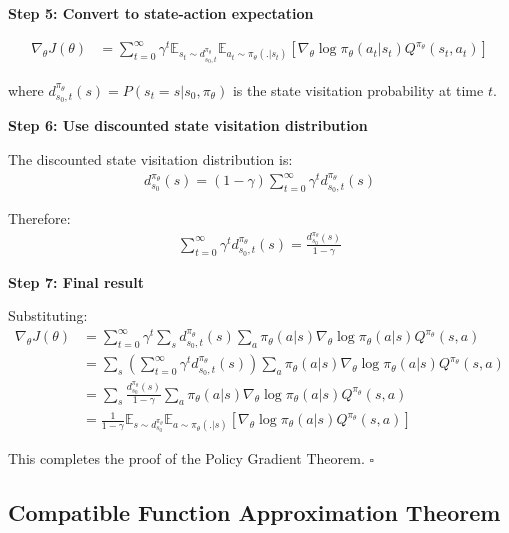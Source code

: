 \textbf{Step 5: Convert to state-action expectation}

\begin{align}
\nabla_\theta J(\theta) &= \sum_{t=0}^{\infty} \gamma^t \mathbb{E}_{s_t \sim d^{\pi_\theta}_{s_0,t}} \mathbb{E}_{a_t \sim \pi_\theta(.|s_t)} \left[ \nabla_\theta \log \pi_\theta(a_t|s_t) Q^{\pi_\theta}(s_t, a_t) \right]
\end{align}

where $d^{\pi_\theta}_{s_0,t}(s) = P(s_t = s | s_0, \pi_\theta)$ is the state visitation probability at time $t$.

\textbf{Step 6: Use discounted state visitation distribution}

The discounted state visitation distribution is:
\begin{align}
d^{\pi_\theta}_{s_0}(s) = (1-\gamma) \sum_{t=0}^{\infty} \gamma^t d^{\pi_\theta}_{s_0,t}(s)
\end{align}

Therefore:
\begin{align}
\sum_{t=0}^{\infty} \gamma^t d^{\pi_\theta}_{s_0,t}(s) = \frac{d^{\pi_\theta}_{s_0}(s)}{1-\gamma}
\end{align}

\textbf{Step 7: Final result}

Substituting:
\begin{align}
\nabla_\theta J(\theta) &= \sum_{t=0}^{\infty} \gamma^t \sum_s d^{\pi_\theta}_{s_0,t}(s) \sum_a \pi_\theta(a|s) \nabla_\theta \log \pi_\theta(a|s) Q^{\pi_\theta}(s, a) \\
&= \sum_s \left( \sum_{t=0}^{\infty} \gamma^t d^{\pi_\theta}_{s_0,t}(s) \right) \sum_a \pi_\theta(a|s) \nabla_\theta \log \pi_\theta(a|s) Q^{\pi_\theta}(s, a) \\
&= \sum_s \frac{d^{\pi_\theta}_{s_0}(s)}{1-\gamma} \sum_a \pi_\theta(a|s) \nabla_\theta \log \pi_\theta(a|s) Q^{\pi_\theta}(s, a) \\
&= \frac{1}{1-\gamma} \mathbb{E}_{s \sim d^{\pi_\theta}_{s_0}} \mathbb{E}_{a \sim \pi_\theta(.|s)} \left[ \nabla_\theta \log \pi_\theta(a|s) Q^{\pi_\theta}(s, a) \right]
\end{align}

This completes the proof of the Policy Gradient Theorem. $\square$


\subsection{Compatible Function Approximation Theorem}

